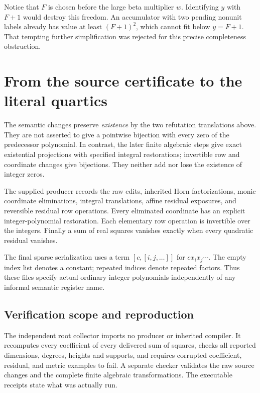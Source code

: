 \documentclass[11pt]{article}
\theoremstyle{remark}\newtheorem{remark}[theorem]{Remark}
\begin{document}
Notice that $F$ is chosen before the large beta multiplier $w$.
Identifying $y$ with $F+1$ would destroy this freedom. An accumulator
with two pending nonunit labels already has value at least $(F+1)^2$,
which cannot fit below $y=F+1$. That tempting further simplification
was rejected for this precise completeness obstruction.

\section{From the source certificate to the literal quartics}

The semantic changes preserve \emph{existence} by the two refutation
translations above. They are not asserted to give a pointwise bijection
with every zero of the predecessor polynomial. In contrast, the later
finite algebraic steps give exact existential projections with specified
integral restorations; invertible row and coordinate changes give
bijections. They neither add nor lose the existence of integer zeros.

The supplied producer records the raw edits, inherited Horn
factorizations, monic coordinate eliminations, integral translations,
affine residual exposures, and reversible residual row operations.
Every eliminated coordinate has an explicit integer-polynomial
restoration. Each elementary row operation is invertible over the
integers. Finally a sum of real squares vanishes exactly when every
quadratic residual vanishes.

The final sparse serialization uses a term $[c,[i,j,\ldots]]$ for
$c x_i x_j\cdots$. The empty index list denotes a constant; repeated
indices denote repeated factors. Thus these files specify actual
ordinary integer polynomials independently of any informal semantic
register name.

\subsection{Verification scope and reproduction}



The independent root collector imports no producer or inherited
compiler. It recomputes every coefficient of every delivered sum of
squares, checks all reported dimensions, degrees, heights and supports,
and requires corrupted coefficient, residual, and metric examples to
fail. A separate checker validates the raw source changes and the
complete finite algebraic transformations. The executable receipts
state what was actually run.
\end{document}
